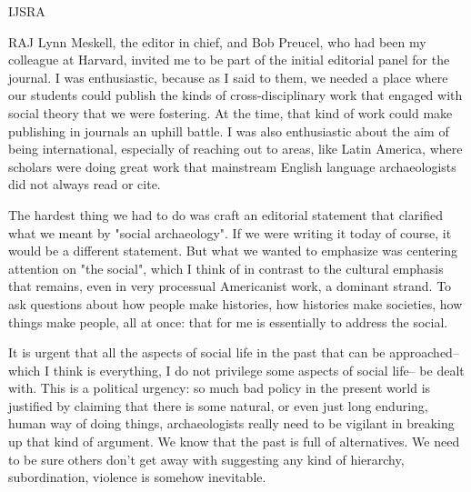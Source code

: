 \begin{labeling}{IJSRA}
\item[RAJ] Lynn Meskell, the editor in chief, and Bob Preucel, who had been my colleague at Harvard, invited me to be part of the initial editorial panel for the journal. I was enthusiastic, because as I said to them, we needed a place where our students could publish the kinds of cross-disciplinary work that engaged with social theory that we were fostering. At the time, that kind of work could make publishing in journals an uphill battle. I was also enthusiastic about the aim of being international, especially of reaching out to areas, like Latin America, where scholars were doing great work that mainstream English language archaeologists did not always read or cite.

The hardest thing we had to do was craft an editorial statement that clarified what we meant by "social archaeology". If we were writing it today of course, it would be a different statement. But what we wanted to emphasize was centering attention on "the social", which I think of in contrast to the cultural emphasis that remains, even in very processual Americanist work, a dominant strand. To ask questions about how people make histories, how histories make societies, how things make people, all at once: that for me is essentially to address the social. 

It is urgent that all the aspects of social life in the past that can be approached-- which I think is everything, I do not privilege some aspects of social life-- be dealt with. This is a political urgency: so much bad policy in the present world is justified by claiming that there is some natural, or even just long enduring, human way of doing things, archaeologists really need to be vigilant in breaking up that kind of argument. We know that the past is full of alternatives. We need to be sure others don't get away with suggesting any kind of hierarchy, subordination, violence is somehow inevitable.



\end{labeling}
